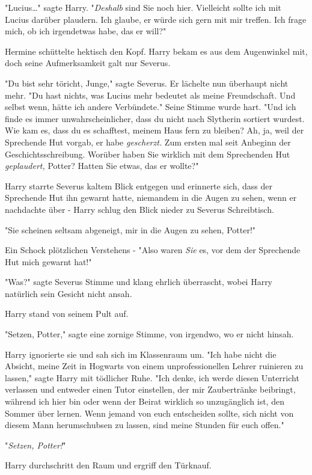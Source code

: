 {"Lucius…" sagte Harry. "\emph{Deshalb} sind Sie noch hier. Vielleicht sollte ich mit Lucius darüber plaudern. Ich glaube, er würde sich gern mit mir treffen. Ich frage mich, ob ich irgendetwas habe, das er will?"

Hermine schüttelte hektisch den Kopf. Harry bekam es aus dem Augenwinkel mit, doch seine Aufmerksamkeit galt nur Severus.

"Du bist sehr töricht, Junge," sagte Severus. Er lächelte nun überhaupt nicht mehr. "Du hast nichts, was Lucius mehr bedeutet als meine Freundschaft. Und selbst wenn, hätte ich andere Verbündete." Seine Stimme wurde hart. "Und ich finde es immer unwahrscheinlicher, dass du nicht nach Slytherin sortiert wurdest. Wie kam es, dass du es schafftest, meinem Haus fern zu bleiben? Ah, ja, weil der Sprechende Hut vorgab, er habe \emph{gescherzt.} Zum ersten mal seit Anbeginn der Geschichtsschreibung. Worüber haben Sie wirklich mit dem Sprechenden Hut \emph{geplaudert,} Potter? Hatten Sie etwas, das er wollte?"

Harry starrte Severus kaltem Blick entgegen und erinnerte sich, dass der Sprechende Hut ihn gewarnt hatte, niemandem in die Augen zu sehen, wenn er nachdachte über - Harry schlug den Blick nieder zu Severus Schreibtisch.

"Sie scheinen seltsam abgeneigt, mir in die Augen zu sehen, Potter!"

Ein Schock plötzlichen Verstehens - "Also waren \emph{Sie} es, vor dem der Sprechende Hut mich gewarnt hat!"

"Was?" sagte Severus Stimme und klang ehrlich überrascht, wobei Harry natürlich sein Gesicht nicht ansah.

Harry stand von seinem Pult auf.

"Setzen, Potter," sagte eine zornige Stimme, von irgendwo, wo er nicht hinsah.

Harry ignorierte sie und sah sich im Klassenraum um. "Ich habe nicht die Absicht, meine Zeit in Hogwarts von einem unprofessionellen Lehrer ruinieren zu lassen," sagte Harry mit tödlicher Ruhe. "Ich denke, ich werde diesen Unterricht verlassen und entweder einen Tutor einstellen, der mir Zaubertränke beibringt, während ich hier bin oder wenn der Beirat wirklich so unzugänglich ist, den Sommer über lernen. Wenn jemand von euch entscheiden sollte, sich nicht von diesem Mann herumschubsen zu lassen, sind meine Stunden für euch offen."

"\emph{Setzen, Potter!}"

Harry durchschritt den Raum und ergriff den Türknauf.

}

